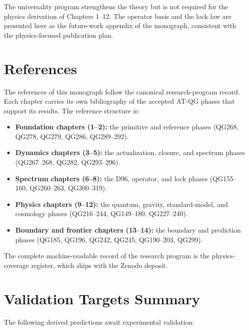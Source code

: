The universality program strengthens the theory but is not required for the physics
derivation of Chapters 1--12. The operator basis and the lock law are presented here as the
future-work appendix of the monograph, consistent with the physics-focused publication plan.

\chapter{References}
\label{app:app:app:references}

The references of this monograph follow the canonical research-program record. Each chapter
carries its own bibliography of the accepted AT-QG phases that support its results. The
reference structure is:

\begin{itemize}
\item \textbf{Foundation chapters (1--2):} the primitive and reference phases
(QG268, QG278, QG279, QG286, QG289--292).
\item \textbf{Dynamics chapters (3--5):} the actualization, closure, and spectrum phases
(QG267--268, QG282, QG293--296).
\item \textbf{Spectrum chapters (6--8):} the D96, operator, and lock phases
(QG155--160, QG260--263, QG300--319).
\item \textbf{Physics chapters (9--12):} the quantum, gravity, standard-model, and
cosmology phases (QG216--244, QG149--180, QG227--240).
\item \textbf{Boundary and frontier chapters (13--14):} the boundary and prediction phases
(QG185, QG196, QG242, QG245, QG190--203, QG299).
\end{itemize}

The complete machine-readable record of the research program is the physics-coverage
register, which ships with the Zenodo deposit.

\chapter{Validation Targets Summary}
\label{app:app:app:validation}

The following derived predictions await experimental validation:

